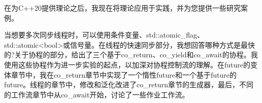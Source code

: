 
在为C++20提供理论之后，我现在将理论应用于实践，并为您提供一些研究案例。

当想要多次同步线程时，可以使用条件变量、std::atomic\_flag、std::atomic<bool>或信号量。在线程的快速同步部分，我想回答哪种方式是最快的?关于协程的部分，给出了三个基于co\_return、co\_yield和co\_await的协程。我使用这些协程作为进一步实验的起点，以加深对协程控制流的理解。在future的变体章节中，我在co\_return章节中实现了一个惰性future和一个基于future的future。线程的章节中，修改和泛化改进了co\_return章节的生成器，最后，不同的工作流章节中从co\_await开始，讨论了一些作业工作流。


